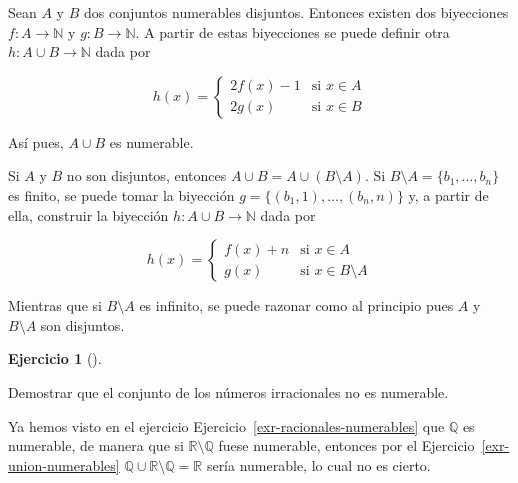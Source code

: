 \documentclass[
  a4paper,
]{scrreport}
\theoremstyle{definition}
\newtheorem{exercise}{Ejercicio}[chapter]
\theoremstyle{remark}
\begin{document}
\begin{tcolorbox}[enhanced jigsaw, breakable, title=\textcolor{quarto-callout-tip-color}{\faLightbulb}\hspace{0.5em}{Solución}, left=2mm, leftrule=.75mm, colback=white, bottomtitle=1mm, coltitle=black, bottomrule=.15mm, colframe=quarto-callout-tip-color-frame, colbacktitle=quarto-callout-tip-color!10!white, rightrule=.15mm, opacitybacktitle=0.6, arc=.35mm, toprule=.15mm, opacityback=0, toptitle=1mm, titlerule=0mm]
Sean \(A\) y \(B\) dos conjuntos numerables disjuntos. Entonces existen
dos biyecciones \(f:A\to \mathbb{N}\) y \(g:B\to \mathbb{N}\). A partir
de estas biyecciones se puede definir otra \(h:A\cup B\to \mathbb{N}\)
dada por

\[h(x)=
\begin{cases}
2f(x)-1 & \mbox{si } x\in A\\
2g(x) & \mbox{si } x\in B
\end{cases}
\]

Así pues, \(A\cup B\) es numerable.

Si \(A\) y \(B\) no son disjuntos, entonces
\(A\cup B=A\cup (B\setminus A)\). Si
\(B\setminus A=\{b_1,\ldots, b_n\}\) es finito, se puede tomar la
biyección \(g=\{(b_1,1),\ldots,(b_n,n)\}\) y, a partir de ella,
construir la biyección \(h:A\cup B\to \mathbb{N}\) dada por

\[h(x)=
\begin{cases}
f(x)+n & \mbox{si } x\in A\\
g(x) & \mbox{si } x\in B\setminus A
\end{cases}
\]

Mientras que si \(B\setminus A\) es infinito, se puede razonar como al
principio pues \(A\) y \(B\setminus A\) son disjuntos.
\end{tcolorbox}

\leavevmode{}%
\begin{exercise}[]\label{exr-irracionales-no-numerables}

Demostrar que el conjunto de los números irracionales no es numerable.

\end{exercise}

\begin{tcolorbox}[enhanced jigsaw, breakable, title=\textcolor{quarto-callout-tip-color}{\faLightbulb}\hspace{0.5em}{Solución}, left=2mm, leftrule=.75mm, colback=white, bottomtitle=1mm, coltitle=black, bottomrule=.15mm, colframe=quarto-callout-tip-color-frame, colbacktitle=quarto-callout-tip-color!10!white, rightrule=.15mm, opacitybacktitle=0.6, arc=.35mm, toprule=.15mm, opacityback=0, toptitle=1mm, titlerule=0mm]
Ya hemos visto en el ejercicio Ejercicio~\ref{exr-racionales-numerables}
que \(\mathbb{Q}\) es numerable, de manera que si
\(\mathbb{R}\setminus \mathbb{Q}\) fuese numerable, entonces por el
Ejercicio~\ref{exr-union-numerables}
\(\mathbb{Q}\cup \mathbb{R}\setminus \mathbb{Q}=\mathbb{R}\) sería
numerable, lo cual no es cierto.
\end{tcolorbox}
\end{document}
